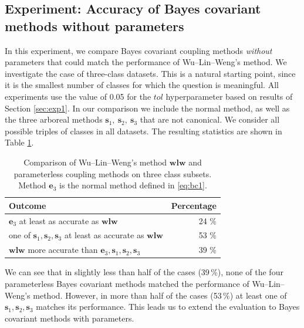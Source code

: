 \documentclass[pdflatex, sn-basic]{sn-jnl}%
\theoremstyle{thmstyleone}%
\theoremstyle{thmstyletwo}%
\theoremstyle{thmstylethree}%
\begin{document}
\subsection{Experiment: Accuracy of Bayes covariant methods without parameters}
 \label{sec:exp2}


In this experiment, we compare  Bayes covariant coupling methods \emph{without} 
parameters that could match the performance of Wu--Lin--Weng's method. 
We investigate the case of three-class datasets. This is a natural starting point, 
since it is the smallest number of classes for which the question is meaningful. 
All experiments use the value of 0.05 for the $tol$ hyperparameter 
based on results of Section \ref{sec:exp1}.  In our comparison we include the 
normal method, as well as the three arboreal methods 
$ \boldsymbol{s}_1,~ \boldsymbol{s}_2,~ \boldsymbol{s}_3$ that are not canonical. 
We consider all possible triples of classes in all datasets. 
The resulting statistics are shown in Table \ref{tab:step2}. 

\begin{table}[ht]
\centering
\begin{tabular}{lr}
  \hline
Outcome & Percentage \\ 
  \hline
 $\boldsymbol{e}_3$ at least as accurate as $\boldsymbol{wlw}$ & 24 \%   \\ 
  one of $\boldsymbol{s}_1, \boldsymbol{s}_2, \boldsymbol{s}_3$ at least as accurate as $\boldsymbol{wlw}$ & 53 \%   \\ 
  $\boldsymbol{wlw}$ more accurate than $\boldsymbol{e}_3, \boldsymbol{s}_1, \boldsymbol{s}_2, \boldsymbol{s}_3$ & 39 \%   \\ 
   \hline
\end{tabular}
\caption{Comparison of Wu--Lin--Weng's method $\boldsymbol{wlw}$ and  parameterless coupling methods on three class subsets. Method $\boldsymbol{e}_3$ is the normal method defined in \eqref{eq:bc1}. } 
\label{tab:step2}
\end{table}


We can see that in slightly less than half of the cases (39\,\%), none of the 
four parameterless Bayes covariant methods matched the performance of 
Wu--Lin--Weng's method. However, in more than half of the cases (53\,\%) 
at least one of $\boldsymbol{s}_1, \boldsymbol{s}_2, \boldsymbol{s}_3$ matches 
its performance. This leads us to extend the evaluation to Bayes covariant methods 
with parameters. 
\end{document}
